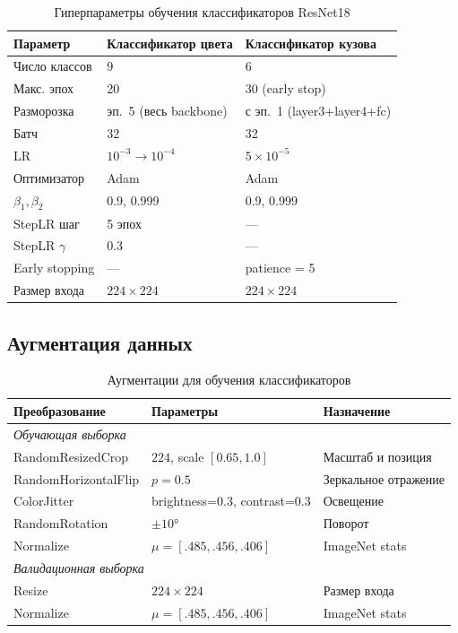\documentclass[14pt,a4paper]{report}
\numberwithin{equation}{chapter}
\numberwithin{figure}{chapter}
\numberwithin{table}{chapter}
\begin{document}
\begin{table}[H]
\centering
\caption{Гиперпараметры обучения классификаторов ResNet18}
\label{tab:resnet_hp}
\small
\begin{tabularx}{\textwidth}{lXX}
\toprule
\textbf{Параметр} & \textbf{Классификатор цвета} & \textbf{Классификатор кузова} \\
\midrule
Число классов     & 9              & 6 \\
Макс. эпох        & 20             & 30 (early stop) \\
Разморозка        & эп.~5 (весь backbone) & с эп.~1 (layer3+layer4+fc) \\
Батч              & 32             & 32 \\
LR                & $10^{-3} \to 10^{-4}$ & $5 \times 10^{-5}$ \\
Оптимизатор       & Adam           & Adam \\
$\beta_1, \beta_2$ & 0.9, 0.999   & 0.9, 0.999 \\
StepLR шаг        & 5 эпох         & ---  \\
StepLR $\gamma$   & 0.3            & ---  \\
Early stopping    & ---            & patience = 5 \\
Размер входа      & $224\times224$ & $224\times224$ \\
\bottomrule
\end{tabularx}
\end{table}

\subsection{Аугментация данных}

\begin{table}[H]
\centering
\caption{Аугментации для обучения классификаторов}
\label{tab:augmentation}
\begin{tabularx}{\textwidth}{lXX}
\toprule
\textbf{Преобразование} & \textbf{Параметры} & \textbf{Назначение} \\
\midrule
\multicolumn{3}{l}{\textit{Обучающая выборка}} \\
RandomResizedCrop   & $224$, scale $[0.65, 1.0]$    & Масштаб и позиция \\
RandomHorizontalFlip & $p=0.5$                      & Зеркальное отражение \\
ColorJitter         & brightness=0.3, contrast=0.3  & Освещение \\
RandomRotation      & $\pm 10°$                     & Поворот \\
Normalize           & $\mu=[.485,.456,.406]$         & ImageNet stats \\
\midrule
\multicolumn{3}{l}{\textit{Валидационная выборка}} \\
Resize              & $224\times224$                 & Размер входа \\
Normalize           & $\mu=[.485,.456,.406]$         & ImageNet stats \\
\bottomrule
\end{tabularx}
\end{table}
\end{document}
